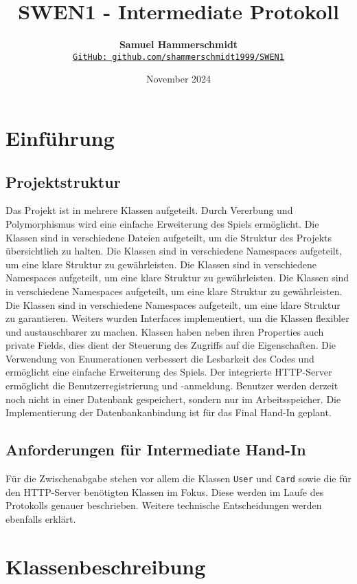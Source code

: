 \documentclass[a4paper, 12pt]{article}
\title{\vspace{-1cm}SWEN1 - Intermediate Protokoll}
\author{
    \textbf{Samuel Hammerschmidt} \\
    \href{https://github.com/shammerschmidt1999/SWEN1}{\texttt{GitHub: github.com/shammerschmidt1999/SWEN1}}
}
\date{November 2024}
\begin{document}
\maketitle

\section{Einführung}
\subsection{Projektstruktur}
Das Projekt ist in mehrere Klassen aufgeteilt. Durch Vererbung und Polymorphismus wird eine einfache Erweiterung des Spiels ermöglicht. Die Klassen sind in verschiedene Dateien aufgeteilt, um die Struktur des Projekts übersichtlich zu halten. Die Klassen sind in verschiedene Namespaces aufgeteilt, um eine klare Struktur zu gewährleisten. Die Klassen sind in verschiedene Namespaces aufgeteilt, um eine klare Struktur zu gewährleisten. Die Klassen sind in verschiedene Namespaces aufgeteilt, um eine klare Struktur zu gewährleisten.
Die Klassen sind in verschiedene Namespaces aufgeteilt, um eine klare Struktur zu garantieren.
Weiters wurden Interfaces implementiert, um die Klassen flexibler und austauschbarer zu machen.
Klassen haben neben ihren Properties auch private Fields, dies dient der Steuerung des Zugriffs auf die Eigenschaften.
Die Verwendung von Enumerationen verbessert die Lesbarkeit des Codes und ermöglicht eine einfache Erweiterung des Spiels.
Der integrierte HTTP-Server ermöglicht die Benutzerregistrierung und -anmeldung. Benutzer werden derzeit noch nicht in einer Datenbank gespeichert, sondern nur im Arbeitsspeicher. Die Implementierung der Datenbankanbindung ist für das Final Hand-In geplant.

\subsection{Anforderungen für Intermediate Hand-In}
Für die Zwischenabgabe stehen vor allem die Klassen \texttt{User} und \texttt{Card} sowie die für den HTTP-Server benötigten Klassen im Fokus. Diese werden im Laufe des Protokolls genauer beschrieben. Weitere technische Entscheidungen werden ebenfalls erklärt.

\vspace{0.5cm}
\section{Klassenbeschreibung}
\end{document}

